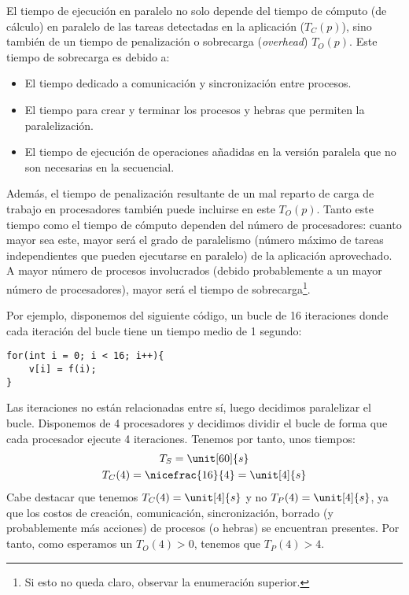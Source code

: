 El tiempo de ejecución en paralelo no solo depende del tiempo de cómputo (de cálculo) en paralelo de las tareas detectadas en la aplicación ($T_C(p)$), sino también de un tiempo de penalización o sobrecarga (\emph{overhead}) $T_O(p)$. Este tiempo de sobrecarga es debido a:
\begin{itemize}
    \item El tiempo dedicado a comunicación y sincronización entre procesos.
    \item El tiempo para crear y terminar los procesos y hebras que permiten la paralelización.
    \item El tiempo de ejecución de operaciones añadidas en la versión paralela que no son necesarias en la secuencial.
\end{itemize}
Además, el tiempo de penalización resultante de un mal reparto de carga de trabajo en procesadores también puede incluirse en este $T_O(p)$.
Tanto este tiempo como el tiempo de cómputo dependen del número de procesadores: cuanto mayor sea este, mayor será el grado de paralelismo (número máximo de tareas independientes que pueden ejecutarse en paralelo) de la aplicación aprovechado. A mayor número de procesos involucrados (debido probablemente a un mayor número de procesadores), mayor será el tiempo de sobrecarga\footnote{Si esto no queda claro, observar la enumeración superior.}.

\begin{ejemplo}
    Por ejemplo, disponemos del siguiente código, un bucle de 16 iteraciones donde cada iteración del bucle tiene un tiempo medio de 1 segundo:
    \begin{verbatim}
for(int i = 0; i < 16; i++){
    v[i] = f(i);
}
    \end{verbatim}
    Las iteraciones no están relacionadas entre sí, luego decidimos paralelizar el bucle. Disponemos de 4 procesadores y decidimos dividir el bucle de forma que cada procesador ejecute 4 iteraciones. Tenemos por tanto, unos tiempos:
    \begin{gather*}
        T_S = \unit[60]{s} \\
        T_C(4) = \nicefrac{16}{4} = \unit[4]{s}
    \end{gather*}
    Cabe destacar que tenemos $T_C(4)=\unit[4]{s}$ y no $T_P(4)=\unit[4]{s}$, ya que los costos de creación, comunicación, sincronización, borrado (y probablemente más acciones) de procesos (o hebras) se encuentran presentes. Por tanto, como esperamos un $T_O(4) > 0$, tenemos que $T_P(4) > 4$.
\end{ejemplo}

